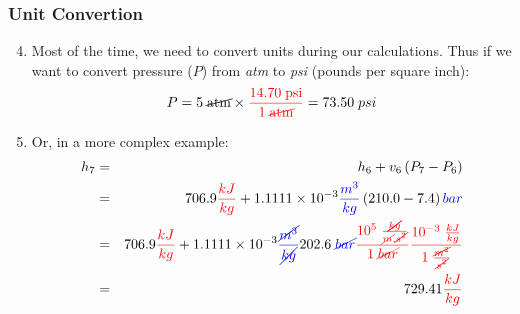 \documentclass[10pt,compress]{beamer}
\begin{document}

\begin{frame}
 \frametitle{Unit Convertion}
  \begin{enumerate}\setcounter{enumi}{3}
   \item<1-> Most of the time, we need to convert units during our calculations. Thus if we want to convert pressure ($P$) from {\it atm} to {\it psi} (pounds per square inch):
      \begin{displaymath}
        P = 5\;\cancel{\text{atm}} \times \textcolor{red}{\displaystyle\frac{14.70\;\text{psi}}{1\;\cancel{\text{atm}}}} = 73.50\;psi
      \end{displaymath}
   \item<2-> Or, in a more complex example:
      \begin{eqnarray}
        h_{7} &=& h_{6} + v_{6}\left(P_{7}-P_{6}\right) \nonumber \\
              &=& 706.9\textcolor{red}{\frac{kJ}{kg}} + 1.1111\times 10^{-3}\textcolor{blue}{\frac{m^{3}}{kg}}\left(210.0-7.4\right)\textcolor{blue}{bar} \nonumber \\
              &=& 706.9\textcolor{red}{\frac{kJ}{kg}} + 1.1111\times 10^{-3}\textcolor{blue}{\frac{\cancel{m^{3}}}{\cancel{kg}}} 202.6\;\textcolor{blue}{\cancel{bar}} \textcolor{red}{\frac{10^{5}\;\frac{\cancel{kg}}{\cancel{m}.\cancel{s^{2}}}}{1\; \cancel{bar}}} \textcolor{red}{\frac{10^{-3}\; \frac{kJ}{kg}}{1\;\frac{\cancel{m^{2}}}{\cancel{s^{2}}}}} \nonumber \\
              &=& 729.41\textcolor{red}{\frac{kJ}{kg}} \nonumber 
      \end{eqnarray} 
  \end{enumerate}
\end{frame}
\end{document}
